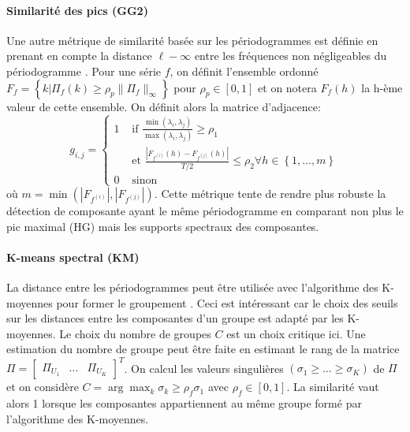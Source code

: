 \documentclass{gretsi}
\newcommand{\val}[3]{(#1_1 #3 \dots #3 #1_#2)}
\newcommand{\set}[1]{\left \{ 1, \dots, #1 \right \}}
\newcommand{\inter}{\left[0, 1\right]}
\begin{document}
\paragraph{Similarité des pics (GG2)}\label{par:GG2}
    Une autre métrique de similarité basée sur les périodogrammes est définie en prenant en compte la distance $\ell-\infty$ entre les fréquences non négligeables du périodogramme \cite{abalov_14_auto}. Pour une série $f$, on définit l'ensemble ordonné $F_f = \left \{ k | \Pi_f(k) \ge \rho_p \|\Pi_f\|_\infty \right \}$ pour $\rho_p \in \inter$ et on notera $F_f(h)$ la h-ème valeur de cette ensemble. On définit alors la matrice d'adjacence:
    $$
    g_{i, j} = \begin{cases}
	    1 & \text{ if } \displaystyle\frac{\min(\lambda_i, \lambda_j)}{\max(\lambda_i, \lambda_j)} \ge \rho_1\\
	      & \text{ et } \frac{|F_{f^{(i)}}(h) - F_{f^{(j)}}(h)|}{T/2} \le \rho_2 \forall h \in \set{m}\\
	    0 & \text{ sinon}
    \end{cases}
    $$ où $m = \min\left(\left|F_{f^{(i)}}\right|, \left|F_{f^{(j)}}\right|\right)$. Cette métrique tente de rendre plus robuste la détection de composante ayant le même périodogramme en comparant non plus le pic maximal (HG) mais les supports spectraux des composantes. 


\paragraph{K-means spectral (KM)}\label{par:KM} La distance entre les périodogrammes peut être utilisée avec l'algorithme des K-moyennes pour former le groupement \cite{alvarez_13_auto}. Ceci est intéressant car le choix des seuils sur les distances entre les composantes d'un groupe est adapté par les K-moyennes. Le choix du nombre de groupes $C$ est un choix critique ici. Une estimation du nombre de groupe peut être faite en estimant le rang de la matrice $\Pi = \begin{bmatrix}\Pi_{U_1}&\dots&\Pi_{U_K}\end{bmatrix}^T$. On calcul les valeurs singulières $\val{\sigma}{K}{\ge}$ de $\Pi$ et on considère $C = \arg\max_k \sigma_k \ge \rho_f \sigma_1$ avec $\rho_f \in \inter$. La similarité vaut alors 1 lorsque les composantes appartiennent au même groupe formé par l'algorithme des K-moyennes.
\end{document}
